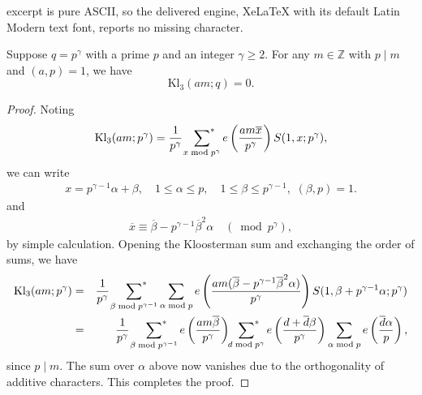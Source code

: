 \documentclass[10pt,a4paper]{amsart}
\newcommand{\Kl}{\mathrm{Kl}}
\newcommand{\bna}{\begin{eqnarray*}}
\newcommand{\ena}{\end{eqnarray*}}
\begin{document}
excerpt is pure ASCII, so the delivered engine, XeLaTeX with its default Latin Modern text font, reports no missing character.
\begin{lemma}\label{lem:Kloosterman=0-initial}
Suppose $q=p^\gamma$ with a prime $p$ and an integer  $\gamma\geqslant2$.
For any $m\in\mathbb{Z}$ with $p\mid m$ and $(a,p)=1$, we have
$$
\Kl_3(am;q)=0.
$$
\end{lemma}

\begin{proof}
Noting
\bna
\text{Kl}_3(am;p^\gamma)=\frac{1}{p^\gamma}\,\,\sideset{}{^*}
\sum_{x\bmod p^\gamma}e\left(\frac{am\overline{x}}{p^\gamma}\right)S(1,x; p^\gamma),
\ena
we can write
\bna
x=p^{\gamma-1}\alpha+\beta,\quad 1\leq\alpha\leq p,\quad 1\leq\beta\leq p^{\gamma-1},\,\, (\beta, p)=1.
\ena
and
\bna
\overline{x}\equiv\overline{\beta}-p^{\gamma-1}\overline{\beta}^2\alpha\quad(\bmod p^\gamma),
\ena
by simple calculation.
Opening the Kloosterman sum and exchanging the order of sums, we have
\bna\label{b6}
\text{Kl}_3(am;p^\gamma)&=&\frac{1}{p^\gamma}\,\,\sideset{}{^*}\sum\limits_{{\beta \bmod p^{\gamma-1}}} \sum_{\alpha \bmod p}
e\left(\frac{am(\overline{\beta}-p^{\gamma-1}\overline{\beta}^2\alpha)}{p^\gamma}\right)S(1,\beta + p^{\gamma-1} \alpha; p^\gamma)\nonumber\\
&=&\frac{1}{p^\gamma}\,\,\sideset{}{^*}\sum\limits_{{\beta \bmod p^{\gamma-1}}}
e\left(\frac{am\overline{\beta}}{p^\gamma}\right)
\sideset{}{^*}\sum_{d\bmod p^\gamma}e\left(\frac{d+\overline{d}\beta}{p^\gamma}\right)
\sum_{\alpha \bmod p}e\left(\frac{\overline{d}\alpha}{p}\right),
\ena
since $p\mid m$.
The sum over $\alpha$ above now vanishes due to the orthogonality of additive characters.
This completes the proof.
\end{proof}
\end{document}
